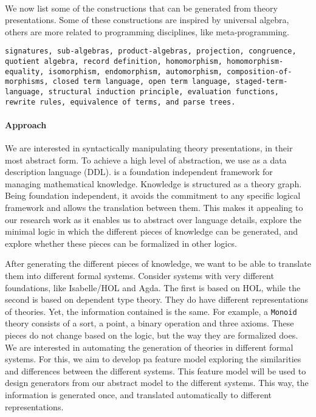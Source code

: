 \documentclass[orivec]{llncs}
\begin{document}
\paragraph{} 
We now list some of the constructions that can be generated from theory presentations. Some of 
these constructions are inspired by universal algebra, others are more related to programming 
disciplines, like meta-programming. 
\begin{lstlisting}
signatures, sub-algebras, product-algebras, projection, congruence, 
quotient algebra, record definition, homomorphism, homomorphism- 
equality, isomorphism, endomorphism, automorphism, composition-of-
morphisms, closed term language, open term language, staged-term-
language, structural induction principle, evaluation functions, 
rewrite rules, equivalence of terms, and parse trees. 
\end{lstlisting}


\paragraph{Approach}
We are interested in syntactically manipulating theory presentations, in their most abstract form. To 
achieve a high level of abstraction, we use \mmt \cite{MMT_homepage} as a data description 
language (DDL). 
\mmt is a foundation independent framework for managing mathematical knowledge. Knowledge is 
structured as a theory graph. 
Being foundation independent, it avoids the commitment to any specific logical framework and allows 
the translation between them. This makes it appealing to our research work as it enables us to abstract 
over language details, explore the minimal logic in which the different pieces of knowledge can be 
generated, and explore whether these pieces can be formalized in other logics. 

After generating the different pieces of knowledge, we want to be able to translate them into different 
formal systems. Consider systems with very different foundations, like Isabelle/HOL and Agda. The first 
is based on HOL, while the second is based on dependent type theory. They do have different 
representations of theories. Yet, the information contained is the same. For example, a \verb|Monoid| 
theory consists of a sort, a point, a binary operation and three axioms. These pieces do not change 
based on the logic, but the way they are formalized does. We are interested in automating the 
generation of theories in different formal systems. For this, we aim to develop pa feature model 
exploring the similarities and differences between the different systems. This feature model will be used 
to design generators from our abstract model to the different systems. This way, the 
information is generated once, and translated automatically to different representations. 
\end{document}
